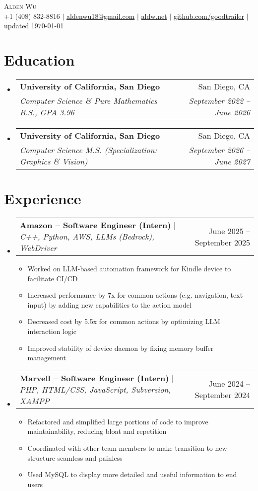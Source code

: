 \documentclass[letterpaper,11pt]{article}
\makeatletter
\newcommand{\resumeItem}[1]{
  \item\small{
    {#1 \vspace{-2pt}}
  }
}
\newcommand{\resumeSubheading}[4]{
  \vspace{-2pt}\item
    \begin{tabular*}{0.97\textwidth}[t]{l@{\extracolsep{\fill}}r}
      \textbf{#1} & #2 \\
      \textit{\small#3} & \textit{\small #4} \\
    \end{tabular*}\vspace{-7pt}
}
\newcommand{\resumeProjectHeading}[2]{
    \item
    \begin{tabular*}{0.97\textwidth}{l@{\extracolsep{\fill}}r}
      \small#1 & #2 \\
    \end{tabular*}\vspace{-7pt}
}
\newcommand{\resumeSubHeadingListStart}{\begin{itemize}[leftmargin=0.15in, label={}]}
\newcommand{\resumeSubHeadingListEnd}{\end{itemize}}
\newcommand{\resumeItemListStart}{\begin{itemize}}
\newcommand{\resumeItemListEnd}{\end{itemize}\vspace{-5pt}}
\makeatother
\begin{document}

\begin{center}
    {\huge \scshape Alden Wu} \\[0.2em]
    \small
    +1 (408) 832-8816 $\mid$
    \href{mailto:aldenwu18@gmail.com}{aldenwu18@gmail.com} $\mid$
    \href{https://aldw.net}{aldw.net} $\mid$
    \href{https://github.com/goodtrailer}{github.com/goodtrailer} $\mid$
    updated \today
\end{center}

\section{Education}
    \resumeSubHeadingListStart
        \resumeSubheading
            {University of California, San Diego}{San Diego, CA}
            {Computer Science \& Pure Mathematics B.S., GPA 3.96}{September 2022 -- June 2026}
        \resumeSubheading
            {University of California, San Diego}{San Diego, CA}
            {Computer Science M.S. (Specialization: Graphics \& Vision)}{September 2026 -- June 2027}
    \resumeSubHeadingListEnd

\section{Experience}
    \resumeSubHeadingListStart
        \resumeProjectHeading
            {\textbf{Amazon -- Software Engineer (Intern)} $\mid$ \emph{C++, Python, AWS, LLMs (Bedrock), WebDriver}}{June 2025 -- September 2025}
            \resumeItemListStart
                \resumeItem{Worked on LLM-based automation framework for Kindle device to facilitate CI/CD}
                \resumeItem{Increased performance by 7x for common actions (e.g. navigation, text input) by adding new capabilities to the action model}
                \resumeItem{Decreased cost by 5.5x for common actions by optimizing LLM interaction logic}
                \resumeItem{Improved stability of device daemon by fixing memory buffer management}
            \resumeItemListEnd
        \resumeProjectHeading
            {\textbf{Marvell -- Software Engineer (Intern)} $\mid$ \emph{PHP, HTML/CSS, JavaScript, Subversion, XAMPP}}{June 2024 -- September 2024}
            \resumeItemListStart
                \resumeItem{Refactored and simplified large portions of code to improve maintainability, reducing bloat and repetition}
                \resumeItem{Coordinated with other team members to make transition to new structure seamless and painless}
                \resumeItem{Used MySQL to display more detailed and useful information to end users}
            \resumeItemListEnd
    \resumeSubHeadingListEnd
\end{document}
